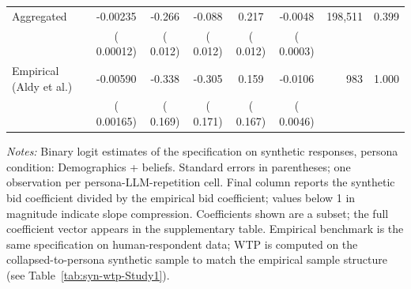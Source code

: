 \begin{table}[h]
\begin{threeparttable}
\begin{tabular}{lcccccrr}
\midrule
Aggregated &  -0.00235 &  -0.266 &  -0.088 &   0.217 & -0.0048 &   198,511 &  0.399 \\
 & (  0.00012) & (  0.012) & (  0.012) & (  0.012) & ( 0.0003) & & \\
\midrule
Empirical (Aldy et al.) &  -0.00590 &  -0.338 &  -0.305 &   0.159 & -0.0106 &       983 & 1.000 \\
 & (  0.00165) & (  0.169) & (  0.171) & (  0.167) & ( 0.0046) & & \\
\bottomrule
\end{tabular}
\begin{tablenotes}\footnotesize
\item \textit{Notes:} Binary logit estimates of the \textcite{Aldy2012} specification on synthetic responses, persona condition: Demographics + beliefs. 
Standard errors in parentheses; one observation per persona-LLM-repetition cell. 
Final column reports the synthetic bid coefficient divided by the empirical bid coefficient; values below 1 in magnitude indicate slope compression. 
Coefficients shown are a subset; the full coefficient vector appears in the supplementary table. 
Empirical benchmark is the same specification on \textcite{Aldy2012} human-respondent data; WTP is computed on the collapsed-to-persona synthetic sample to match the empirical sample structure (see Table~\ref{tab:syn-wtp-Study1}).
\end{tablenotes}
\end{threeparttable}
\end{table}
